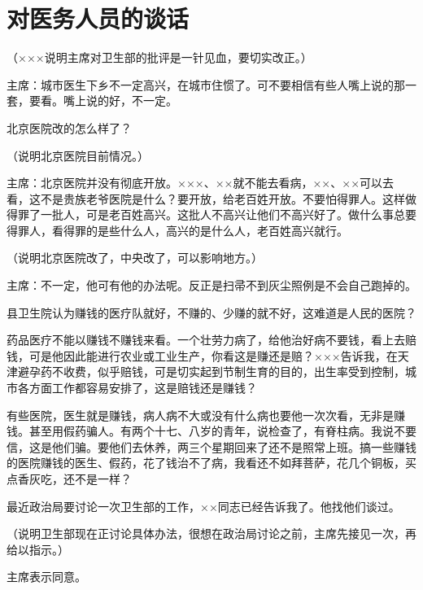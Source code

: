 \section[对医务人员的谈话（一九六五年七月十九日）]{对医务人员的谈话}


（×××说明主席对卫生部的批评是一针见血，要切实改正。）

主席：城市医生下乡不一定高兴，在城市住惯了。可不要相信有些人嘴上说的那一套，要看。嘴上说的好，不一定。

北京医院改的怎么样了？

（说明北京医院目前情况。）

主席：北京医院并没有彻底开放。×××、××就不能去看病，××、××可以去看，这不是贵族老爷医院是什么？要开放，给老百姓开放。不要怕得罪人。这样做得罪了一批人，可是老百姓高兴。这批人不高兴让他们不高兴好了。做什么事总要得罪人，看得罪的是些什么人，高兴的是什么人，老百姓高兴就行。

（说明北京医院改了，中央改了，可以影响地方。）

主席：不一定，他可有他的办法呢。反正是扫帚不到灰尘照例是不会自己跑掉的。

县卫生院认为赚钱的医疗队就好，不赚的、少赚的就不好，这难道是人民的医院？

药品医疗不能以赚钱不赚钱来看。一个壮劳力病了，给他治好病不要钱，看上去赔钱，可是他因此能进行农业或工业生产，你看这是赚还是赔？×××告诉我，在天津避孕药不收费，似乎赔钱，可是切实起到节制生育的目的，出生率受到控制，城市各方面工作都容易安排了，这是赔钱还是赚钱？

有些医院，医生就是赚钱，病人病不大或没有什么病也要他一次次看，无非是赚钱。甚至用假药骗人。有两个十七、八岁的青年，说检查了，有脊柱病。我说不要信，这是他们骗。要他们去休养，两三个星期回来了还不是照常上班。搞一些赚钱的医院赚钱的医生、假药，花了钱治不了病，我看还不如拜菩萨，花几个铜板，买点香灰吃，还不是一样？

最近政治局要讨论一次卫生部的工作，××同志已经告诉我了。他找他们谈过。

（说明卫生部现在正讨论具体办法，很想在政治局讨论之前，主席先接见一次，再给以指示。）

主席表示同意。

